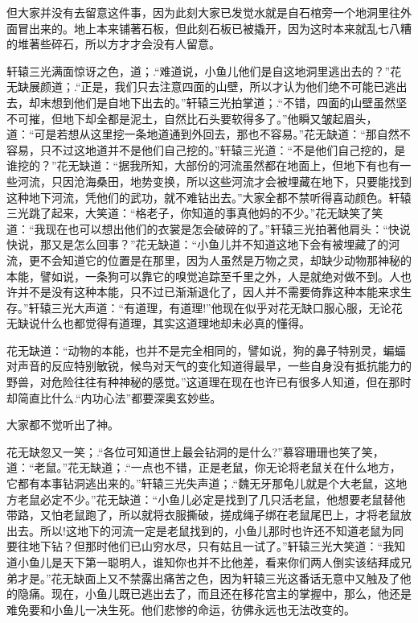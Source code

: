 \documentclass[12pt,oneside]{book}
\begin{document}
但大家并没有去留意这件事，因为此刻大家已发觉水就是自石棺旁一个地洞里往外面冒出来的。地上本来铺著石板，但此刻石板已被撬开，因为这时本来就乱七八糟的堆著些碎石，所以方才才会没有人留意。

轩辕三光满面惊讶之色，道；.``难道说，小鱼儿他们是自这地洞里逃出去的？''花无缺展颜道；.``正是，我们只去注意四面的山壁，所以才认为他们绝不可能已逃出去，却末想到他们是自地下出去的。''轩辕三光拍掌道；.``不错，四面的山壁虽然坚不可摧，但地下却全都是泥土，自然比石头要软得多了。''他瞬又皱起眉头，道：``可是若想从这里挖一条地道通到外回去，那也不容易。''花无缺道：``那自然不容易，只不过这地道并不是他们自己挖的。''轩辕三光道：``不是他们自己挖的，是谁挖的？''花无缺道：``据我所知，大部份的河流虽然都在地面上，但地下有也有一些河流，只因沧海桑田，地势变换，所以这些河流才会被埋藏在地下，只要能找到这种地下河流，凭他们的武功，就不难钻出去。''大家全都不禁听得喜动颜色。轩辕三光跳了起来，大笑道：``格老子，你知道的事真他妈的不少。''花无缺笑了笑道：``我现在也可以想出他们的衣裳是怎会破碎的了。''轩辕三光拍著他肩头：``快说快说，那又是怎么回事？''花无缺道：``小鱼儿并不知道这地下会有被埋藏了的河流，更不会知道它的位置是在那里，因为人虽然是万物之灵，却缺少动物那神秘的本能，譬如说，一条狗可以靠它的嗅觉追踪至千里之外，人是就绝对做不到。人也许并不是没有这种本能，只不过已渐渐退化了，因人并不需要倚靠这种本能来求生存。''轩辕三光大声道：``有道理，有道理!''他现在似乎对花无缺口服心服，无论花无缺说什么也都觉得有道理，其实这道理地却未必真的懂得。

花无缺道：``动物的本能，也并不是完全相同的，譬如说，狗的鼻子特别灵，蝙蝠对声音的反应特别敏锐，候鸟对天气的变化知道得最早，一些自身没有抵抗能力的野兽，对危险往往有种神秘的感觉。''这道理在现在也许已有很多人知道，但在那时却简直比什么.``内功心法''都要深奥玄妙些。

大家都不觉听出了神。

花无缺忽又一笑；.``各位可知道世上最会钻洞的是什么?''慕容珊珊也笑了笑，道：``老鼠。''花无缺道；.``一点也不错，正是老鼠，你无论将老鼠关在什么地方，它都有本事钻洞逃出来的。''轩辕三光失声道；.``魏无牙那龟儿就是个大老鼠，这地方老鼠必定不少。''花无缺道：``小鱼儿必定是找到了几只活老鼠，他想要老鼠替他带路，又怕老鼠跑了，所以就将衣服撕破，搓成绳子绑在老鼠尾巴上，才将老鼠放出去。所以!这地下的河流一定是老鼠找到的，小鱼儿那时也许还不知道老鼠为同要往地下钻？但那时他们已山穷水尽，只有姑且一试了。''轩辕三光大笑道：``我知道小鱼儿是天下第一聪明人，谁知你也并不比他差，看来你们两人倒实该结拜成兄弟才是。''花无缺面上又不禁露出痛苦之色，因为轩辕三光这番话无意中又触及了他的隐痛。现在，小鱼儿既已逃出去了，而且还在移花宫主的掌握中，那么，他还是难免要和小鱼儿一决生死。他们悲惨的命运，彷佛永远也无法改变的。
\end{document}
